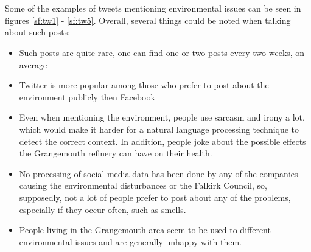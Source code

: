 \begin{figure}[t!]
\begin{minipage}{10cm}
 \end{minipage}
 \\ \vspace{0.1cm}
 \begin{minipage}{10cm}
     \centering
 \end{minipage}
 \\ \vspace{0.1cm}
 \begin{minipage}{10cm}
     \centering
 \end{minipage}
 \label{fig:multifigtweets}
 \end{figure}
 
 Some of the examples of tweets mentioning environmental issues can be seen in figures \ref{sf:tw1} - \ref{sf:tw5}. Overall, several things could be noted when talking about such posts:
 \begin{itemize}
     \item Such posts are quite rare, one can find one or two posts every two weeks, on average
     \item Twitter is more popular among those who prefer to post about the environment publicly then Facebook
     \item Even when mentioning the environment, people use sarcasm and irony a lot, which would make it harder for a natural language processing technique to detect the correct context. In addition, people joke about the possible effects the Grangemouth refinery can have on their health.  
     \item No processing of social media data has been done by any of the companies causing the environmental disturbances or the Falkirk Council, so, supposedly, not a lot of people prefer to post about any of the problems, especially if they occur often, such as smells.
     \item People living in the Grangemouth area seem to be used to different environmental issues and are generally unhappy with them.
 \end{itemize}

